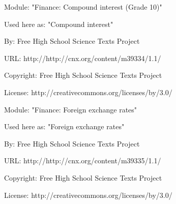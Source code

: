       \par\vspace{9pt}\noindent\begin{minipage}{\textwidth}
      Module: "Finance: Compound interest (Grade 10)" \par\nopagebreak\noindent
      Used here as: "Compound interest" \par\nopagebreak\noindent
        By: Free High School Science Texts Project\par\nopagebreak\noindent
      URL: http://http://cnx.org/content/m39334/1.1/\par\nopagebreak\noindent
      \par\nopagebreak\noindent
      Copyright: Free High School Science Texts Project\par\nopagebreak\noindent
      License:  http://creativecommons.org/licenses/by/3.0/\par\nopagebreak\noindent
      \par\end{minipage}
      \par\vspace{9pt}\noindent\begin{minipage}{\textwidth}
      Module: "Finance: Foreign exchange rates" \par\nopagebreak\noindent
      Used here as: "Foreign exchange rates" \par\nopagebreak\noindent
        By: Free High School Science Texts Project\par\nopagebreak\noindent
      URL: http://http://cnx.org/content/m39335/1.1/\par\nopagebreak\noindent
      \par\nopagebreak\noindent
      Copyright: Free High School Science Texts Project\par\nopagebreak\noindent
      License:  http://creativecommons.org/licenses/by/3.0/\par\nopagebreak\noindent
      \par\end{minipage}
